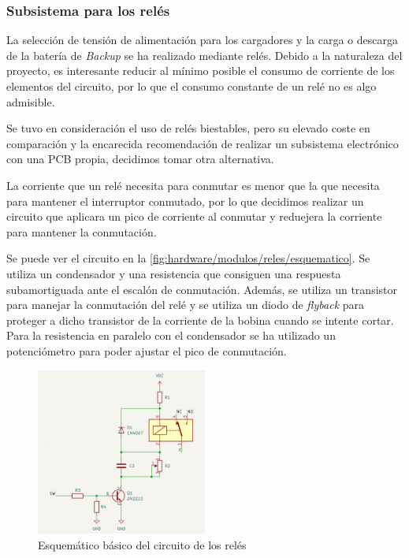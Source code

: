 \subsubsection{Subsistema para los relés}

La selección de tensión de alimentación para los cargadores y la carga o descarga de la batería de \textit{Backup} se ha realizado mediante relés. Debido a la naturaleza del proyecto, es interesante reducir al mínimo posible el consumo de corriente de los elementos del circuito, por lo que el consumo constante de un relé no es algo admisible.

Se tuvo en consideración el uso de relés biestables, pero su elevado coste en comparación y la encarecida recomendación de realizar un subsistema electrónico con una PCB propia, decidimos tomar otra alternativa. 

La corriente que un relé necesita para conmutar es menor que la que necesita para mantener el interruptor conmutado, por lo que decidimos realizar un circuito que aplicara un pico de corriente al conmutar y reduejera la corriente para mantener la conmutación. 

Se puede ver el circuito en la \autoref{fig:hardware/modulos/reles/esquematico}. Se utiliza un condensador y una resistencia que consiguen una respuesta subamortiguada ante el escalón de conmutación. Además, se utiliza un transistor para manejar la conmutación del relé y se utiliza un diodo de \textit{flyback} para proteger a dicho transistor de la corriente de la bobina cuando se intente cortar. Para la resistencia en paralelo con el condensador se ha utilizado un potenciómetro para poder ajustar el pico de conmutación. 

\begin{figure}[H]
    \centering
    \includegraphics[width=0.5\textwidth]{images/2-hardware/componentes/rele/circuitoRele.png}
    \caption{Esquemático básico del circuito de los relés}
    \label{fig:hardware/modulos/reles/esquematico}
\end{figure}

